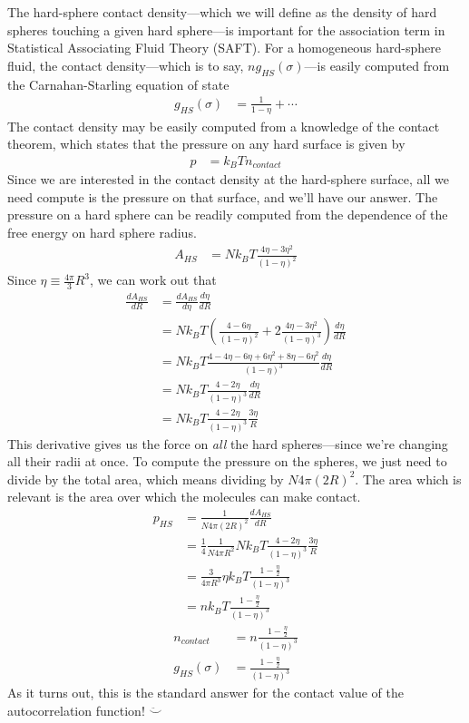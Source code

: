 \documentclass[letterpaper,twocolumn,amsmath,amssymb,prb]{revtex4-1}
\begin{document}
The hard-sphere contact density---which we will define as the density
of hard spheres touching a given hard sphere---is important for the
association term in Statistical Associating Fluid Theory (SAFT).  For
a homogeneous hard-sphere fluid, the contact density---which is to
say, $n g_{HS}(\sigma)$---is easily computed from the
Carnahan-Starling equation of state
\begin{align}
  g_{HS}(\sigma) &= \frac{1}{1-\eta} + \cdots
\end{align}
The contact density may be easily computed from a knowledge of the
contact theorem, which states that the pressure on any hard surface is
given by
\begin{align}
  p &= k_BT n_\textit{contact}
\end{align}
Since we are interested in the contact density at the hard-sphere
surface, all we need compute is the pressure on that surface, and
we'll have our answer.  The pressure on a hard sphere can be readily
computed from the dependence of the free energy on hard sphere
radius.
\begin{align}
  A_{HS} &= Nk_BT \frac{4\eta - 3\eta^2}{(1-\eta)^2}
\end{align}
Since $\eta \equiv \frac{4\pi}{3} R^3$, we can work out that
\begin{align}
  \frac{dA_{HS}}{dR} &= \frac{dA_{HS}}{d\eta} \frac{d\eta}{dR} \\
  &= Nk_BT \left( \frac{4 - 6\eta}{(1-\eta)^2} + 2 \frac{4\eta - 3\eta^2}{(1-\eta)^3} \right) \frac{d\eta}{dR}
  \\
  &= Nk_BT \frac{4 - 4\eta - 6\eta + 6\eta^2 + 8\eta - 6\eta^2}{(1-\eta)^3} \frac{d\eta}{dR}
  \\
  &= Nk_BT \frac{4 - 2\eta}{(1-\eta)^3} \frac{d\eta}{dR}
  \\
  &= Nk_BT \frac{4 - 2\eta}{(1-\eta)^3} \frac{3 \eta}{R} \label{eq:dAhsdR}
\end{align}
This derivative gives us the force on \emph{all} the hard
spheres---since we're changing all their radii at once.  To compute
the pressure on the spheres, we just need to divide by the total area,
which means dividing by $N 4\pi (2R)^2$.  The area which is relevant
is the area over which the molecules can make contact.
\begin{align}
  p_{HS} &= \frac{1}{N 4\pi (2R)^2} \frac{dA_{HS}}{dR} \\
  &= \frac14 \frac{1}{N 4\pi R^2} Nk_BT \frac{4 - 2\eta}{(1-\eta)^3} \frac{3 \eta}{R} \\
  &= \frac{3}{4\pi R^3} \eta k_BT \frac{1 - \frac{\eta}2}{(1-\eta)^3} \\
  &= n k_BT \frac{1 - \frac{\eta}2}{(1-\eta)^3}
\end{align}
\begin{align}
  n_\textit{contact} &= n \frac{1 - \frac{\eta}2}{(1-\eta)^3} \\
  g_{HS}(\sigma) &= \frac{1 - \frac{\eta}2}{(1-\eta)^3}
\end{align}
As it turns out, this is the standard answer for the contact value of
the autocorrelation function! $\ddot\smile$
\end{document}
